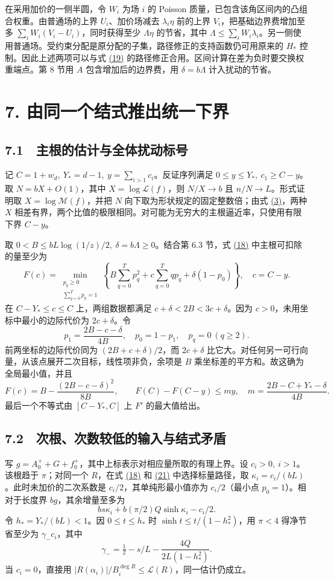 \documentclass[11pt,a4paper]{article}
\begin{document}
在采用加价的一侧半圆，令 \(W_i\) 为场 \(i\) 的 Poisson 质量，已包含该角区间内的凸组合权重。由普通场的上界 \(U_i\)、加价场减去 \(\lambda_i\eta\) 前的上界 \(V_i\)，把基础边界费增加至多 \(\sum_i W_i(V_i-U_i)\)，同时获得至少 \(\Lambda\eta\) 的节省，其中 \(\Lambda\le\sum_iW_i\lambda_i\)。另一侧使用普通场。受约束分配是原分配的子集，路径修正的支持函数仍可用原来的 \(H_*\) 控制。因此上述两项可以与式 \hyperref[eq:19]{(19)} 的路径修正合用。区间计算在差为负时要交换权重端点。第 8 节用 \(A\) 包含增加后的边界费，用 \(\delta=b\Lambda\) 计入扰动的节省。


\section{7. 由同一个结式推出统一下界}
\subsection{7.1　主根的估计与全体扰动标号}
记 \(C=1+w_d,\ Y_*=d-1,\ y=\sum_{i>1}c_i\)。反证序列满足 \(0\le y\le Y_*,\ c_1\ge C-y\)。取 \(N=bX+O(1)\)，其中 \(X=\log\mathcal L(f)\)，则 \(N/X\to b\) 且 \(n/N\to L\)。形式证明取 \(X=\log\mathcal M(f)\)，并把 \(N\) 向下取为形状规定的固定整数倍；由式 \hyperref[eq:3]{(3)}，两种 \(X\) 相差有界，两个比值的极限相同。对可能为无穷大的主根逼近率，只使用有限下界 \(C-y\)。

取 \(0<B\le bL\log(1/z)/2,\ \delta=b\Lambda\ge0\)。结合第 6.3 节，式 \hyperref[eq:18]{(18)} 中主根可扣除的量至少为
\[
 F(c)=\min_{\substack{p_q\ge0\\\sum_{q=0}^T p_q=1}}
 \left\{ B\sum_{q=0}^T p_q^2+c\sum_{q=0}^T q p_q+\delta(1-p_0)\right\},
 \quad c=C-y . \tag{22}\label{eq:22}
\]
在 \(C-Y_*\le c\le C\) 上，两组数据都满足 \(c+\delta<2B<3c+\delta\)。因为 \(c>0\)，未用坐标中最小的边际代价为 \(2c+\delta\)。令
\[
 p_1=\frac{2B-c-\delta}{4B},\quad p_0=1-p_1,\quad p_q=0\ (q\ge2).
\]
前两坐标的边际代价同为 \((2B+c+\delta)/2\)，而 \(2c+\delta\) 比它大。对任何另一可行向量，从该点展开二次目标，线性项非负，余项是 \(B\) 乘坐标差的平方和。故这确为全局最小值，并且
\[
 F(c)=B-\frac{(2B-c-\delta)^2}{8B},\qquad
 F(C)-F(C-y)\le my,\quad m=\frac{2B-C+Y_*-\delta}{4B}. \tag{23}\label{eq:23}
\]
最后一个不等式由 \([C-Y_*,C]\) 上 \(F'\) 的最大值给出。

\subsection{7.2　次根、次数较低的输入与结式矛盾}
写 \(g=A_0^++G+f_0^+\)，其中上标表示对相应量所取的有理上界。设 \(c_i>0,\ i>1\)。该根趋于 \(\pi\)；对同一个 \(R\)，在式 \hyperref[eq:18]{(18)} 和 \hyperref[eq:21]{(21)} 中选择标量路径，取 \(\kappa_i=c_i/(bL)\)。此时未加价的二次系数是 \(c_i/2\)，其单纯形最小值亦为 \(c_i/2\)（最小点 \(p_0=1\)）。相对于长度界 \(bg\)，其余增量至多为
\[
 b s\kappa_i+b(\pi/2)Q\sinh\kappa_i-c_i/2 .
\]
令 \(h_*=Y_* /(bL)<1\)。因 \(0\le t\le h_*\) 时 \(\sinh t\le t/(1-h_*^2)\)，用 \(\pi<4\) 得净节省至少为 \(\gamma_-c_i\)，其中
\[
 \gamma_-=\tfrac12-s/L-\frac{4Q}{2L(1-h_*^2)}. \tag{24}\label{eq:24}
\]
当 \(c_i=0\)，直接用 \(|R(\alpha_i)|/B_i^{\deg R}\le\mathcal L(R)\)，同一估计仍成立。
\end{document}
